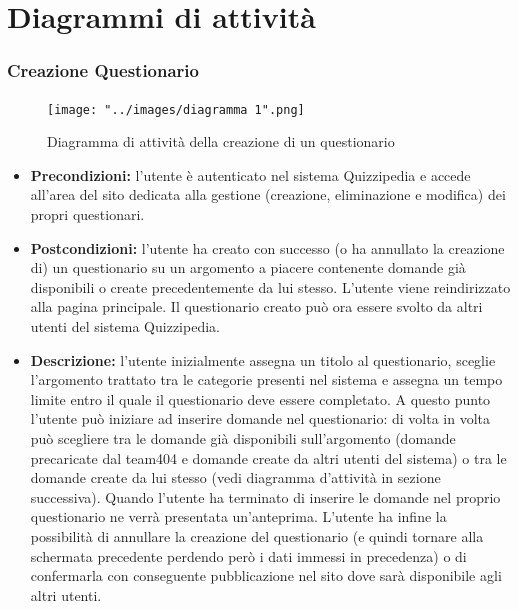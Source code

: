 \documentclass[a4paper,11pt]{article}
\begin{document}
	\section{Diagrammi di attività}
	
\subsubsection{Creazione Questionario}
\begin{figure}[h!]
\begin{center}
	\centerline{\texttt{[image: "../images/diagramma 1".png]}}
	\caption{Diagramma di attività della creazione di un questionario}
\end{center}
\end{figure}
\begin{itemize}
\item\textbf{Precondizioni:} l'utente è autenticato nel sistema Quizzipedia e accede all'area del sito dedicata alla gestione (creazione, eliminazione e modifica) dei propri questionari.
\item\textbf{Postcondizioni:} l'utente ha creato con successo (o ha annullato la creazione di) un questionario su un argomento a piacere contenente domande già disponibili o create precedentemente da lui stesso. L'utente viene reindirizzato alla pagina principale. Il questionario creato può ora essere svolto da altri utenti del sistema Quizzipedia. %
\item\textbf{Descrizione:} l'utente inizialmente assegna un titolo al questionario, sceglie l'argomento trattato tra le categorie presenti nel sistema e assegna un tempo limite entro il quale il questionario deve essere completato. A questo punto l'utente può iniziare ad inserire domande nel questionario: di volta in volta può scegliere tra le domande già disponibili sull'argomento (domande precaricate dal team404 e domande create da altri utenti del sistema) o tra le domande create da lui stesso (vedi diagramma d'attività in sezione successiva). Quando l'utente ha terminato di inserire le domande nel proprio questionario ne verrà presentata un'anteprima. L'utente ha infine la possibilità di annullare la creazione del questionario (e quindi tornare alla schermata precedente perdendo però i dati immessi in precedenza) o di confermarla con conseguente pubblicazione nel sito dove sarà disponibile agli altri utenti.
\end{itemize}

\newpage
\end{document}
